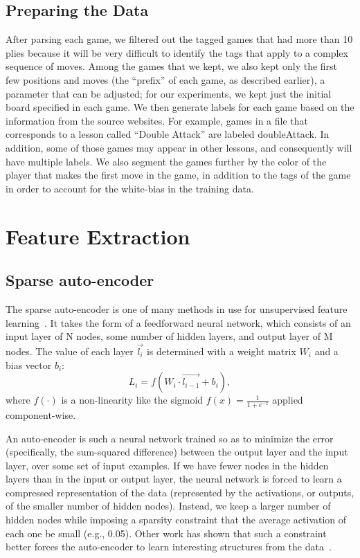 \documentclass[11pt]{article}
\begin{document}
\subsection{Preparing the Data}
After parsing each game, we filtered out the tagged games that had more than 10 plies because it will be very difficult to identify the tags that apply to a complex sequence of moves. Among the games that we kept, we also kept only the first few positions and moves (the ``prefix'' of each game, as described earlier), a parameter that can be adjusted; for our experiments, we kept just the initial board specified in each game. We then generate labels for each game based on the information from the source websites. For example, games in a file that corresponds to a lesson called ``Double Attack'' are labeled doubleAttack. In addition, some of those games may appear in other lessons, and consequently will have multiple labels. We also segment the games further by the color of the player that makes the first move in the game, in addition to the tags of the game in order to account for the white-bias in the training data.

\section{Feature Extraction}
\subsection{Sparse auto-encoder}
The sparse auto-encoder is one of many methods in use for unsupervised feature learning~\cite{Coates}. It takes the form of a feedforward neural network, which consists of an input layer of N nodes, some number of hidden layers, and output layer of M nodes. The value of each layer $\vec{l_i}$ is determined with a weight matrix $W_i$ and a bias vector $b_i$: \[L_i = f(W_i \cdot \vec{l_{i-1}} + b_i),\] where $f(\cdot)$ is a non-linearity like the sigmoid $f(x) = \frac{1}{1 + e^{-z}}$ applied component-wise.

An auto-encoder is such a neural network trained so as to minimize the error (specifically, the sum-squared difference) between the output layer and the input layer, over some set of input examples. If we have fewer nodes in the hidden layers than in the input or output layer, the neural network is forced to learn a compressed representation of the data (represented by the activations, or outputs, of the smaller number of hidden nodes). Instead, we keep a larger number of hidden nodes while imposing a sparsity constraint that the average activation of each one be small (e.g., 0.05). Other work has shown that such a constraint better forces the auto-encoder to learn interesting structures from the data~\cite{bengio}.
\end{document}
